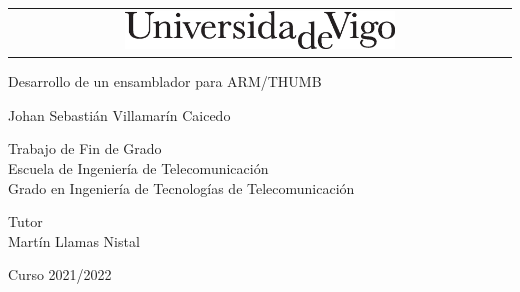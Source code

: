 

\usepackage{appendix}
\renewcommand{\appendixname}{Anexos}
\renewcommand{\appendixtocname}{Anexos}
\renewcommand{\appendixpagename}{Anexos}

\usepackage{pdfpages}
\usepackage{graphicx}
\usepackage{grffile}
\usepackage[left=2cm,right=2cm,top=2cm,bottom=2cm]{geometry}



\begin{titlepage}

\Large
\sffamily

\begin{center}
  \begin{tabular}{c}
    \includegraphics[width=0.55\textwidth]{./images/unilogo}
  \end{tabular}
\end{center}

\vfill
\begin{center}
  \huge 
    {\huge Desarrollo de un ensamblador para ARM/THUMB}

\vspace{24pt}
\textcolor{gray}{\small{}}
\end{center}

\vspace*{2cm}
\centerline{{\huge Johan Sebastián Villamarín Caicedo}}

\vfill

\begin{center}
{\large
  Trabajo de Fin de Grado \\
  Escuela de Ingeniería de Telecomunicación \\
  Grado en Ingeniería de Tecnologías de Telecomunicación
}
\end{center}

\vfill
\begin{center}{
{   Tutor \\
    Martín Llamas Nistal
}
}
\end{center}
\vfill
\centerline{\fontsize{11}{13.8} \selectfont Curso 2021/2022}
\end{titlepage}

\newpage
\tableofcontents
\listoffigures
\setcounter{page}{1}


\newpage
